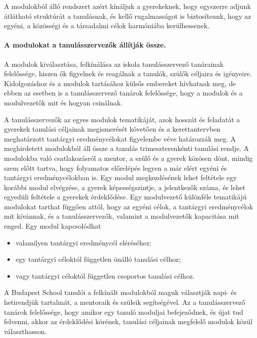 A modulokból álló rendszert azért kínáljuk a gyerekeknek, hogy egyszerre adjunk
átlátható struktúrát a tanulásnak, és kellő rugalmasságot is biztosítsunk, hogy
az egyéni, a közösségi és a társadalmi célok harmóniába kerülhessenek.

\paragraph{A modulokat a tanulásszervezők állítják össze.}

A modulok kiválasztása, felkínálása az iskola tanulásszervező tanárainak
felelőssége, hiszen ők figyelnek és reagálnak a tanulók, szülők céljaira és
igényeire. Kidolgozáshoz és a modulok tartásához külsős embereket hívhatnak
meg, de ebben az esetben is a tanulásszervező tanárok felelőssége, hogy a
modulok és a modulvezetők mit és hogyan csinálnak.

A tanulásszervezők az egyes modulok tematikáját, azok hosszát és feladatát a
gyerekek tanulási céljainak megismerését követően és a kerettantervben
meghatárzott tantárgyi eredménycélokat figyelembe véve határozzák meg. A
meghirdetett modulokból áll össze a tanulás trimeszterenkénti tanulási rendje.
A modulokba való csatlakozásról a mentor, a szülő és a gyerek közösen dönt,
mindig szem előtt tartva, hogy folyamatos előrelépés legyen a már elért egyéni
és tantárgyi eredménycélokban is. Egy modul megkezdésének lehet feltétele egy
korábbi modul elvégzése, a gyerek képességszintje, a jelentkezők száma, és
lehet egyedüli feltétele a gyerekek érdeklődése. Egy modulvezető különféle
tematikájú modulokat tarthat függően attól, hogy az egyéni célok, a tantárgyi
eredménycélok mit kívánnak, és a tanulásszervezők, valamint a modulvezetők
kapacitása mit enged. Egy modul kapcsolódhat

\begin{itemize}

  \item valamilyen tantárgyi eredménycél eléréséhez;
  \item egy tantárgyi céloktól független önálló tanulási célhoz;
  \item vagy tantárgyi céloktól független csoportos tanulási célhoz.
\end{itemize}

A Budapest School tanulói a felkínált modulokból maguk választják napi- és
hetirendjük tartalmát, a mentoraik és szüleik segítségével. Az a
tanulásszervező tanárok felelőssége, hogy amikor egy tanuló moduljai
befejeződnek, és újat tud felvenni, akkor az érdeklődési körének, tanulási
céljainak megfelelő modulok közül választhasson.

